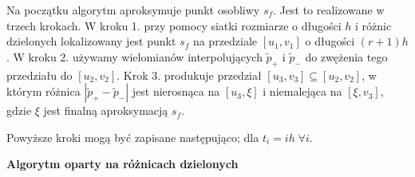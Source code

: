 \documentclass[oik, pdftex, robocza, man]{mgrwms}
\begin{document}
    Na początku algorytm aproksymuje punkt osobliwy $s_f$. Jest to realizowane w trzech krokach. W kroku 1. przy pomocy siatki rozmiarze o długości $h$ i różnic dzielonych lokalizowany jest punkt $s_f$ na przedziale $[u_1, v_1]$ o długości $(r + 1)h$. W kroku 2. używamy wielomianów interpolujących $\tilde{p}_+$ i $\tilde{p}_-$ do zwężenia tego przedziału do $[u_2, v_2]$. Krok 3. produkuje przedział $[u_3, v_3] \subseteq [u_2, v_2]$, w którym różnica $|\tilde{p}_{+} - \tilde{p}_{-}|$ jest nierosnąca na $[u_3, \xi]$ i niemalejąca na $[\xi, v_3]$, gdzie $\xi$ jest finalną aproksymacją $s_f$.

    Powyższe kroki mogą być zapisane następująco; dla $t_i = ih \; \forall i$. \vspace{10pt}

    \newpage
    \textbf{Algorytm oparty na różnicach dzielonych}
\end{document}
